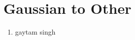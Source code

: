 \documentclass[journal,12pt,twocolumn]{IEEEtran}
\renewcommand\thesection{\arabic{section}}
\begin{document}
\section{Gaussian to Other}
%
\begin{enumerate}[label=\thesection.\arabic*,ref=\thesection.\theenumi]
%
\item gaytam singh
\end{enumerate}
%
\end{document}
